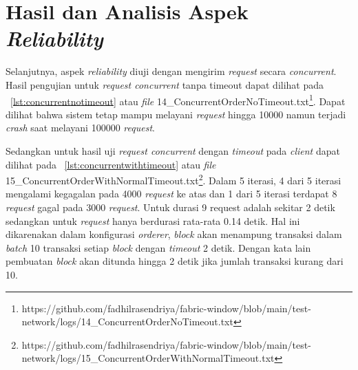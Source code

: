 

\section{Hasil dan Analisis Aspek \textit{Reliability}}
Selanjutnya, aspek \textit{reliability} diuji dengan mengirim \textit{request} secara \textit{concurrent}. Hasil pengujian untuk \textit{request concurrent} tanpa timeout dapat dilihat pada \lst~\ref{lst:concurrentnotimeout} atau \textit{file} 14\_ConcurrentOrderNoTimeout.txt\footnote{\scriptsize https://github.com/fadhilrasendriya/fabric-window/blob/main/test-network/logs/14\_ConcurrentOrderNoTimeout.txt}. Dapat dilihat bahwa sistem tetap mampu melayani \textit{request} hingga 10000 namun terjadi \textit{crash} saat melayani 100000 \textit{request}. 



Sedangkan untuk hasil uji \textit{request concurrent} dengan \textit{timeout} pada \textit{client} dapat dilihat pada \lst~\ref{lst:concurrentwithtimeout} atau \textit{file} 15\_ConcurrentOrderWithNormalTimeout.txt\footnote{\scriptsize https://github.com/fadhilrasendriya/fabric-window/blob/main/test-network/logs/15\_ConcurrentOrderWithNormalTimeout.txt}. Dalam 5 iterasi, 4 dari 5 iterasi mengalami kegagalan pada 4000 \textit{request} ke atas dan 1 dari 5 iterasi terdapat 8 \textit{request} gagal pada 3000 \textit{request}. Untuk durasi 9 request adalah sekitar 2 detik sedangkan untuk \textit{request} hanya berdurasi rata-rata 0.14 detik. Hal ini dikarenakan dalam konfigurasi \textit{orderer}, \textit{block} akan menampung transaksi dalam \textit{batch} 10 transaksi setiap \textit{block} dengan \textit{timeout} 2 detik. Dengan kata lain pembuatan \textit{block} akan ditunda hingga 2 detik jika jumlah transaksi kurang dari 10.



